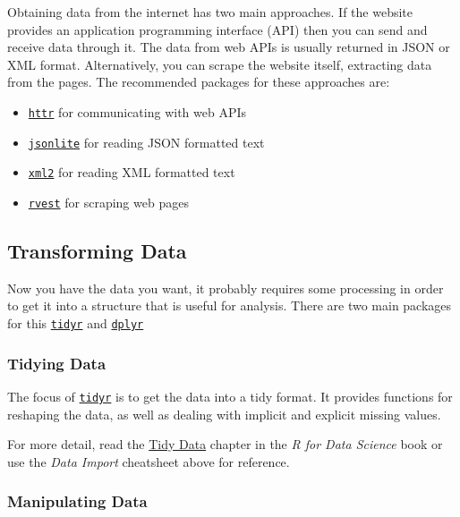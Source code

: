 \documentclass[]{book}
\providecommand{\tightlist}{%
  \setlength{\itemsep}{0pt}\setlength{\parskip}{0pt}}
\begin{document}
Obtaining data from the internet has two main approaches. If the website provides an
application programming interface (API) then you can send and receive data through it.
The data from web APIs is usually returned in JSON or XML format. Alternatively, you can
scrape the website itself, extracting data from the pages. The recommended packages for
these approaches are:

\begin{itemize}
\tightlist
\item
  \href{http://httr.r-lib.org/}{\texttt{httr}} for communicating with web APIs
\item
  \href{https://www.rdocumentation.org/packages/jsonlite}{\texttt{jsonlite}} for reading JSON
  formatted text
\item
  \href{https://www.rdocumentation.org/packages/xml2}{\texttt{xml2}} for reading XML formatted text
\item
  \href{https://www.rdocumentation.org/packages/rvest}{\texttt{rvest}} for scraping
  web pages
\end{itemize}

\hypertarget{transforming-data}{%
\subsection{Transforming Data}\label{transforming-data}}

Now you have the data you want, it probably requires some processing in order to get it
into a structure that is useful for analysis. There are two main packages for this
\href{http://tidyr.tidyverse.org}{\texttt{tidyr}} and \href{http://dplyr.tidyverse.org}{\texttt{dplyr}}

\hypertarget{tidying-data}{%
\subsubsection{Tidying Data}\label{tidying-data}}

The focus of \href{http://tidyr.tidyverse.org}{\texttt{tidyr}} is to get the data into a tidy format.
It provides functions for reshaping the data, as well as dealing with implicit and explicit
missing values.

For more detail, read the \href{https://r4ds.had.co.nz/tidy-data.html}{Tidy Data} chapter in
the \emph{R for Data Science} book or use the \emph{Data Import} cheatsheet above for reference.

\hypertarget{manipulating-data}{%
\subsubsection{Manipulating Data}\label{manipulating-data}}
\end{document}
